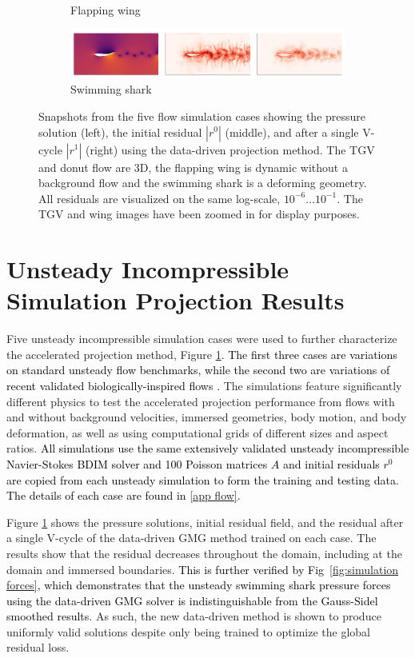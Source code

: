 \documentclass[]{elsarticle}
\begin{document}
\begin{figure}
\begin{subfigure}[c]{\textwidth}
        \caption{Flapping wing}
    \end{subfigure}
    \begin{subfigure}[b]{\textwidth}
        \centering
        \includegraphics[width=\textwidth]{figures/sharktriple.png}
        \caption{Swimming shark}
    \end{subfigure}
    \hfill
    \caption{Snapshots from the five flow simulation cases showing the pressure solution (left), the initial residual $|r^0|$ (middle), and after a single V-cycle $|r^1|$ (right) using the data-driven projection method. The TGV and donut flow are 3D, the flapping wing is dynamic without a background flow and the swimming shark is a deforming geometry. All residuals are visualized on the same log-scale, $10^{-6} \ldots 10^{-1}$. The TGV and wing images have been zoomed in for display purposes.}
    \label{fig:simulation cases}
\end{figure}

\section{Unsteady Incompressible Simulation Projection Results}

Five unsteady incompressible simulation cases were used to further characterize the accelerated projection method, Figure \ref{fig:simulation cases}. \textcolor{black}{The first three cases are variations on standard unsteady flow benchmarks, while the second two are variations of recent validated biologically-inspired flows \cite{Lauber2022}.} The simulations feature significantly different physics to test the accelerated projection performance from flows with and without background velocities, immersed geometries, body motion, and body deformation, as well as using computational grids of different sizes and aspect ratios. \textcolor{black}{All simulations use the same extensively validated unsteady incompressible Navier-Stokes BDIM solver \cite{maertens2015accurate,Lauber2022} and 100 Poisson matrices $A$ and initial residuals $r^0$ are copied from each unsteady simulation to form the training and testing data. The details of each case are found in \ref{app flow}.}

Figure \ref{fig:simulation cases} shows the pressure solutions, initial residual field, and the residual after a single V-cycle of the data-driven GMG method trained on each case. The results show that the residual decreases throughout the domain, including at the domain and immersed boundaries. \textcolor{black}{This is further verified by Fig~\ref{fig:simulation forces}, which demonstrates that the unsteady swimming shark pressure forces using the data-driven GMG solver is indistinguishable from the Gauss-Sidel smoothed results.} As such, the new data-driven method is shown to produce uniformly valid solutions despite only being trained to optimize the global residual loss.
\end{document}

